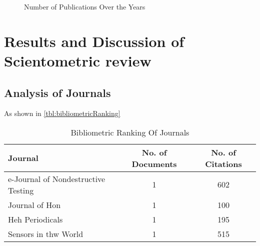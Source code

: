 \documentclass[journal, a4paper]{IEEEtran}
\begin{document}
\begin{figure}
  \centering
  \caption{Number of Publications Over the Years}
  \label{fig:publications}
\end{figure}

\lipsum[1]


\section{Results and Discussion of Scientometric review}
\lipsum[1]


\subsection{Analysis of Journals}
As shown in \autoref{tbl:bibliometricRanking} \lipsum[1]


\begin{table}[htbp]

  \centering
  \caption{Bibliometric Ranking Of Journals}
  \label{tbl:bibliometricRanking}
  \begin{tabular}{lcc}

      \toprule
      \textbf{Journal} & \textbf{No. of Documents} & \textbf{No. of Citations} \\
      \midrule
      e-Journal of Nondestructive Testing                   & 1     & 602   \\
      Journal of Hon                   & 1     & 100   \\
      Heh Periodicals                  & 1     & 195   \\
      Sensors in thw World             & 1     & 515   \\
      \bottomrule
  \end{tabular}
\end{table}
\end{document}
